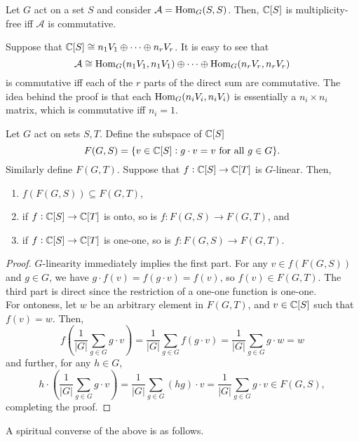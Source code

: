	\begin{flem}
		\label{lem:multiplicity-free}
		Let $G$ act on a set $S$ and consider $\mathcal{A} = \operatorname{Hom}_G(S,S)$. Then, $\mathbb{C}[S]$ is multiplicity-free iff $\mathcal{A}$ is commutative.
	\end{flem}
	Suppose that $\mathbb{C}[S] \cong n_1 V_1 \oplus \cdots \oplus n_r V_r$. It is easy to see that
	\[ \mathcal{A} \cong \operatorname{Hom}_G(n_1 V_1, n_1 V_1) \oplus \cdots \oplus \operatorname{Hom}_G(n_r V_r, n_r V_r) \]
	is commutative iff each of the $r$ parts of the direct sum are commutative. The idea behind the proof is that each $\operatorname{Hom}_G(n_i V_i, n_i V_i)$ is essentially a $n_i \times n_i$ matrix, which is commutative iff $n_i = 1$.

	\begin{flem}
		Let $G$ act on sets $S,T$. Define the subspace of $\mathbb{C}[S]$
		\[ F(G,S) = \{v \in \mathbb{C}[S] : g \cdot v = v \text{ for all } g \in G \}. \]
		Similarly define $F(G,T)$. Suppose that $f : \mathbb{C}[S] \to \mathbb{C}[T]$ is $G$-linear. Then,
		\begin{enumerate}[label=(\alph*)]
			\item $f(F(G,S)) \subseteq F(G,T)$,
			\item if $f : \mathbb{C}[S] \to \mathbb{C}[T]$ is onto, so is $f : F(G,S) \to F(G,T)$, and
			\item if $f : \mathbb{C}[S] \to \mathbb{C}[T]$ is one-one, so is $f : F(G,S) \to F(G,T)$. 
		\end{enumerate}
	\end{flem}
	\begin{proof}
		$G$-linearity immediately implies the first part. For any $v \in f(F(G,S))$ and $g \in G$, we have $g \cdot f(v) = f(g \cdot v) = f(v)$, so $f(v) \in F(G,T)$. The third part is direct since the restriction of a one-one function is one-one.\\
		For ontoness, let $w$ be an arbitrary element in $F(G,T)$, and $v \in \mathbb{C}[S]$ such that $f(v) = w$. Then,
		\[ f\left(\frac{1}{|G|} \sum_{g \in G} g \cdot v\right) = \frac{1}{|G|} \sum_{g \in G} f(g \cdot v) = \frac{1}{|G|} \sum_{g \in G} g \cdot w = w \]
		and further, for any $h \in G$,
		\[ h \cdot \left(\frac{1}{|G|} \sum_{g \in G} g \cdot v\right) = \frac{1}{|G|} \sum_{g \in G} (hg) \cdot v = \frac{1}{|G|} \sum_{g \in G} g \cdot v \in F(G,S), \]
		completing the proof.
	\end{proof}

	A spiritual converse of the above is as follows.

